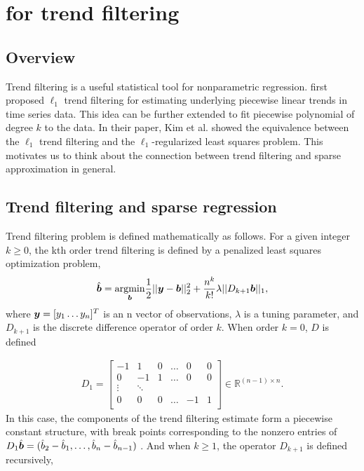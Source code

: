 \section{\susie for trend filtering}
\subsection{Overview}

  Trend filtering is a useful statistical tool for nonparametric regression. \cite{Kim07l1trend} first proposed $\ell_1$ trend filtering for estimating underlying piecewise linear trends in time series data. This idea can be further extended to fit piecewise polynomial of degree $k$ to the data. In their paper, Kim et al. showed the equivalence between the $\ell_1$ trend filtering and the $\ell_1$-regularized least squares problem. This motivates us to think about the connection between trend filtering and sparse approximation in general. 

\subsection{Trend filtering and sparse regression}
Trend filtering problem is defined mathematically as follows. For a given integer $k \geq 0$, the kth order trend filtering is defined by a penalized least squares optimization problem,
\begin{align}
\hat{\bm b} = \underset{\bm b}{\mathrm{argmin}} \frac{1}{2}|| \bm y- \bm b||_2^2 + \frac{n^k}{k!}\lambda||D_{k+1}\bm b||_1,
\end{align}
where $\bm y = [y_1 \dots y_n]^T$ is an n vector of observations, $\lambda$ is a tuning parameter, and $D_{k+1}$ is the discrete difference operator of order $k$. When order $k=0$, $D$ is defined 

\begin{align}\label{D1}
D_{1} = \begin{bmatrix} 
    -1 & 1 & 0 & \dots & 0 & 0\\
    0 & -1 & 1 & \dots & 0 & 0\\
    \vdots & \ddots & \\
    0 & 0 & 0 & \dots & -1 & 1\\
    \end{bmatrix}
    \in \mathbb{R}^{(n-1)\times n}.
\end{align}
In this case, the components of the trend filtering estimate form a piecewise constant structure, with break points corresponding to the nonzero entries of $D_{1}\hat{\bm b} = (\hat{b}_2 - \hat{b}_1, \dots, \hat{b}_n - \hat{b}_{n-1})$ \cite{Tibshirani2014}. And when $k\geq 1$, the operator $D_{k+1}$ is defined recursively,

